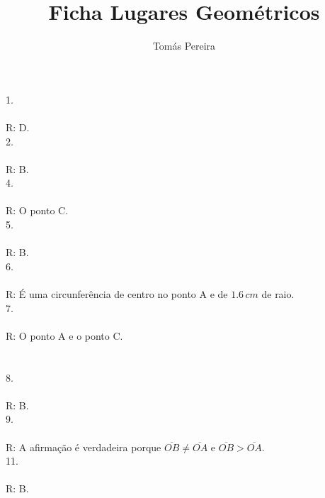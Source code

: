 \documentclass[12pt]{article}
\title{Ficha Lugares Geométricos}
\author{Tomás Pereira}
\begin{document}
\maketitle

1.\\\\
R: D.\\

2.\\\\
R: B.\\

4.\\\\
R: O ponto C.\\

5.\\\\
R: B.\\

6.\\\\
R: É uma circunferência de centro no ponto A e de $1.6\,cm$ de raio.\\

7.\\\\
R: O ponto A e o ponto C.\\\\\\

8.\\\\
R: B.\\

9.\\\\
R: A afirmação é verdadeira porque $\overline{OB}\neq\overline{OA}$ e $\overline{OB}>\overline{OA}$.\\

11.\\\\
R: B.\\
\end{document}
